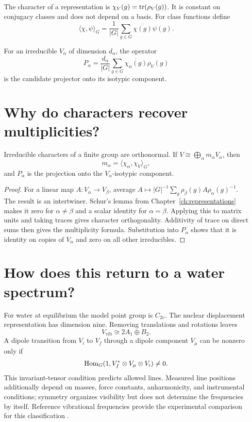 The character of a representation is
$\chi_V(g)=\operatorname{tr}(\rho_V(g))$.  It is constant on conjugacy classes and does not
depend on a basis.  For class functions define
\[
\langle\chi,\psi\rangle_G
=\frac1{|G|}\sum_{g\in G}\overline{\chi(g)}\psi(g).
\]

For an irreducible $V_\alpha$ of dimension $d_\alpha$, the operator
\[
P_\alpha=\frac{d_\alpha}{|G|}
\sum_{g\in G}\overline{\chi_\alpha(g)}\rho_V(g)
\]
is the candidate projector onto its isotypic component.

\section{Why do characters recover multiplicities?}

\begin{theorem}
Irreducible characters of a finite group are orthonormal.  If
$V\cong\bigoplus_\alpha m_\alpha V_\alpha$, then
\[
m_\alpha=\langle\chi_\alpha,\chi_V\rangle_G,
\]
and $P_\alpha$ is the projection onto the $V_\alpha$-isotypic component.
\end{theorem}

\begin{proof}
For a linear map $A:V_\alpha\to V_\beta$, average
$A\mapsto |G|^{-1}\sum_g\rho_\beta(g)A\rho_\alpha(g)^{-1}$.
The result is an intertwiner.  Schur's lemma from
Chapter~\ref{ch:representations} makes it zero for $\alpha\ne\beta$ and a
scalar identity for $\alpha=\beta$.  Applying this to matrix units and taking
traces gives character orthogonality.  Additivity of trace on direct sums
then gives the multiplicity formula.  Substitution into $P_\alpha$ shows that
it is identity on copies of $V_\alpha$ and zero on all other irreducibles.
\end{proof}

\section{How does this return to a water spectrum?}

For water at equilibrium the model point group is $C_{2v}$.  The nuclear
displacement representation has dimension nine.  Removing translations and
rotations leaves
\[
V_{\mathrm{vib}}\cong2A_1\oplus B_2.
\]
A dipole transition from $V_i$ to $V_f$ through a dipole component $V_\mu$
can be nonzero only if
\[
\operatorname{Hom}_G(1,V_f^*\otimes V_\mu\otimes V_i)\ne0.
\]
This invariant-tensor condition predicts allowed lines.  Measured line
positions additionally depend on masses, force constants, anharmonicity, and
instrumental conditions; symmetry organizes visibility but does not determine
the frequencies by itself.  Reference vibrational frequencies provide the
experimental comparison for this classification \cite{shimanouchi}.

